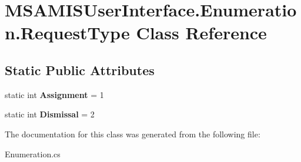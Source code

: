 \hypertarget{class_m_s_a_m_i_s_user_interface_1_1_enumeration_1_1_request_type}{}\section{M\+S\+A\+M\+I\+S\+User\+Interface.\+Enumeration.\+Request\+Type Class Reference}
\label{class_m_s_a_m_i_s_user_interface_1_1_enumeration_1_1_request_type}
\subsection*{Static Public Attributes}
\begin{DoxyCompactItemize}
\item 
\mbox{\label{class_m_s_a_m_i_s_user_interface_1_1_enumeration_1_1_request_type_a8d310e5020a5a45c9b945e5590ff3099}} 
static int {\bfseries Assignment} = 1
\item 
\mbox{\label{class_m_s_a_m_i_s_user_interface_1_1_enumeration_1_1_request_type_a0e0b65cf156707ba719b9d2aae1848ef}} 
static int {\bfseries Dismissal} = 2
\end{DoxyCompactItemize}


The documentation for this class was generated from the following file\+:\begin{DoxyCompactItemize}
\item 
Enumeration.\+cs\end{DoxyCompactItemize}
